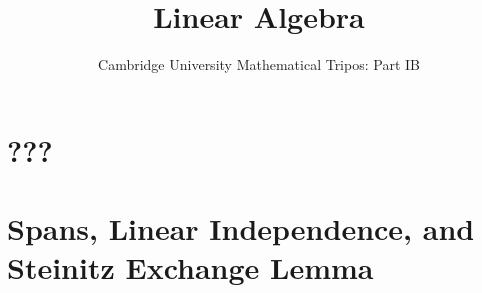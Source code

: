 \documentclass{article}
\title{Linear Algebra}
\author{Cambridge University Mathematical Tripos: Part IB}
\begin{document}
\maketitle

\tableofcontentsnewpage{}

\section{???}

\section{Spans, Linear Independence, and Steinitz Exchange Lemma}

\end{document}
